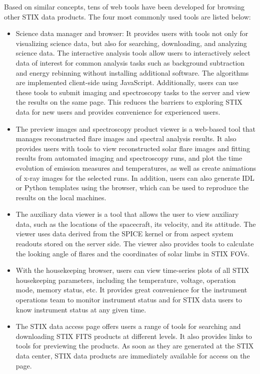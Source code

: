\documentclass[referee]{aa} %
\begin{document}
Based on similar concepts, tens of web tools have been developed for 
browsing other STIX data products. The four most commonly used tools are listed below: 
\begin{itemize}
  \item  Science data manager and browser: It provides users with tools not only for visualizing science data, but also for searching, downloading, and analyzing science data. The interactive analysis tools allow users to interactively select data of interest for common analysis tasks such as background subtraction and energy rebinning without installing additional software. The algorithms are implemented client-side using JavaScript. 
 Additionally, users can use these tools to submit imaging and spectroscopy tasks to the server and view the results on the same page. This reduces the barriers to exploring STIX data for new users and provides convenience for experienced users.

  \item  The preview images and spectroscopy product viewer is a web-based tool that manages reconstructed flare images and spectral analysis results. It also provides users with tools to view reconstructed solar flare images and fitting results from automated imaging and spectroscopy runs, and plot the time evolution of emission measures and temperatures, as well as create animations of x-ray images for the selected runs. In addition, users can also generate IDL or Python templates using the browser, which can be used to reproduce the results on the local machines.
  \item The auxiliary data viewer is a tool that allows the user to view auxiliary data, such as the locations of the spacecraft, its velocity, and its attitude. The viewer uses data derived from the SPICE kernel or from aspect system readouts stored on the server side.  The viewer also provides tools to calculate the looking angle of flares and the coordinates of solar limbs in STIX FOVs.
  \item  With the housekeeping browser, users can view time-series plots of all STIX housekeeping parameters, including the temperature, voltage, operation mode, memory status, etc. It provides great convenience for the instrument operations team to monitor instrument status  and for STIX data users to know instrument status at any given time.
\item 
The STIX data access page offers users a range of tools for searching and downloading STIX FITS products at different levels. 
It also provides links to tools for previewing the products. As soon as they are generated at the STIX data center, STIX data products are immediately available for access on the page.
\end{itemize}
\end{document}

